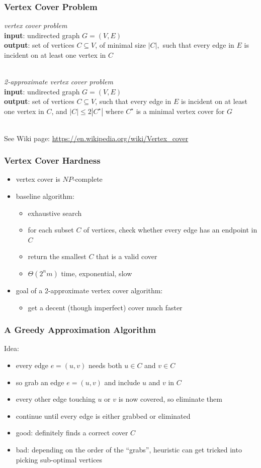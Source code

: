 \documentclass{beamer}
\newcommand{\stanza}{ \\~\ }
\begin{document}
\begin{frame} \frametitle{Vertex Cover Problem}
\emph{vertex cover problem} \\
\textbf{input}: undirected graph $G=(V,E)$ \\
\textbf{output}: set of vertices $C \subseteq V$, of minimal size $|C|,$ such
  that every edge in $E$ is incident on at least one vertex in $C$
 \stanza

 \emph{2-approximate vertex cover problem} \\
 \textbf{input}: undirected graph $G=(V,E)$ \\
 \textbf{output}: set of vertices $C \subseteq V$, such
   that every edge in $E$ is incident on at least one vertex in $C$, and
   $|C| \leq 2 |C^\star|$ where $C^\star$ is a minimal vertex cover for $G$
  \stanza

See Wiki page: \url{https://en.wikipedia.org/wiki/Vertex_cover}
\end{frame}

\begin{frame} \frametitle{Vertex Cover Hardness}
  \begin{itemize}
    \item vertex cover is $NP$-complete
    \item baseline algorithm:
    \begin{itemize}
      \item exhaustive search
      \item for each subset $C$ of vertices, check whether every edge has an
        endpoint in $C$
      \item return the smallest $C$ that is a valid cover
      \item $\Theta(2^n m)$ time, exponential, slow
    \end{itemize}
    \item goal of a 2-approximate vertex cover algorithm:
    \begin{itemize}
      \item get a decent (though imperfect) cover much faster
    \end{itemize}
  \end{itemize}
\end{frame}

\begin{frame} \frametitle{A Greedy Approximation Algorithm}
Idea:
\begin{itemize}
  \item every edge $e=(u,v)$ needs both $u \in C$ and $v \in C$
  \item so grab an edge $e=(u,v)$ and include $u$ and $v$ in $C$
  \item every other edge touching $u$ or $v$ is now covered, so eliminate them
  \item continue until every edge is either grabbed or eliminated
  \item good: definitely finds a correct cover $C$
  \item bad: depending on the order of the ``grabs'', heuristic can get tricked
    into picking sub-optimal vertices
\end{itemize}
\end{frame}
\end{document}
